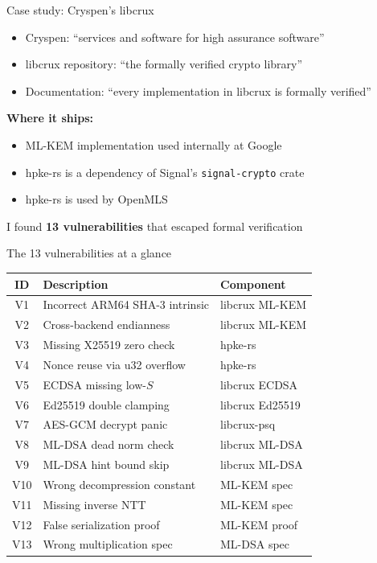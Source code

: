 \ifdefined\PRESENTATION\else\PassOptionsToClass{handout}{beamer}\fi\documentclass[aspectratio=169, lualatex]{beamer}
\begin{document}
\begin{frame}{Case study: Cryspen's libcrux}
	\begin{itemize}
		\item Cryspen: ``services and software for high assurance software''
		\item libcrux repository: ``the formally verified crypto library''
		\item Documentation: ``every implementation in libcrux is formally verified''
	\end{itemize}
	\vspace{0.5em}
	\textbf{Where it ships:}
	\begin{itemize}
		\item ML-KEM implementation used internally at Google
		\item hpke-rs is a dependency of Signal's \texttt{signal-crypto} crate
		\item hpke-rs is used by OpenMLS
	\end{itemize}
	\vspace{0.5em}
	\begin{center}
		\Large
		I found \textbf{13 vulnerabilities} that escaped formal verification
	\end{center}
\end{frame}

\begin{frame}{The 13 vulnerabilities at a glance}
	\begin{center}
		\small
		\begin{tabular}{|c|l|l|}
			\hline
			\textbf{ID} & \textbf{Description}            & \textbf{Component} \\
			\hline
			V1          & Incorrect ARM64 SHA-3 intrinsic & libcrux ML-KEM     \\
			V2          & Cross-backend endianness        & libcrux ML-KEM     \\
			V3          & Missing X25519 zero check       & hpke-rs            \\
			V4          & Nonce reuse via u32 overflow    & hpke-rs            \\
			V5          & ECDSA missing low-$S$           & libcrux ECDSA      \\
			V6          & Ed25519 double clamping         & libcrux Ed25519    \\
			V7          & AES-GCM decrypt panic           & libcrux-psq        \\
			V8          & ML-DSA dead norm check          & libcrux ML-DSA     \\
			V9          & ML-DSA hint bound skip          & libcrux ML-DSA     \\
			V10         & Wrong decompression constant    & ML-KEM spec        \\
			V11         & Missing inverse NTT             & ML-KEM spec        \\
			V12         & False serialization proof       & ML-KEM proof       \\
			V13         & Wrong multiplication spec       & ML-DSA spec        \\
			\hline
		\end{tabular}
	\end{center}
\end{frame}
\end{document}
